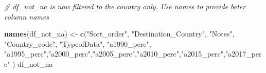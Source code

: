 \documentclass[]{article}
\newenvironment{Shaded}{\begin{snugshade}}{\end{snugshade}}
\newcommand{\CommentTok}[1]{\textcolor[rgb]{0.56,0.35,0.01}{\textit{#1}}}
\newcommand{\KeywordTok}[1]{\textcolor[rgb]{0.13,0.29,0.53}{\textbf{#1}}}
\newcommand{\NormalTok}[1]{#1}
\newcommand{\StringTok}[1]{\textcolor[rgb]{0.31,0.60,0.02}{#1}}
\begin{document}
\begin{Shaded}
\begin{Highlighting}[]
\CommentTok{# df_not_na is now filtered to the country only. Use names to provide beter column names}

\KeywordTok{names}\NormalTok{(df_not_na) <-}\StringTok{ }\KeywordTok{c}\NormalTok{(}\StringTok{"Sort_order"}\NormalTok{, }\StringTok{"Destination_Country"}\NormalTok{, }\StringTok{"Notes"}\NormalTok{, }\StringTok{"Country_code"}\NormalTok{, }\StringTok{"TypeofData"}\NormalTok{, }\StringTok{"a1990_perc"}\NormalTok{, }\StringTok{"a1995_perc"}\NormalTok{,}\StringTok{"a2000_perc"}\NormalTok{,}\StringTok{"a2005_perc"}\NormalTok{,}\StringTok{"a2010_perc"}\NormalTok{,}\StringTok{"a2015_perc"}\NormalTok{,}\StringTok{"a2017_perc"}\NormalTok{ )}
\NormalTok{df_not_na}
\end{Highlighting}
\end{Shaded}
\end{document}
